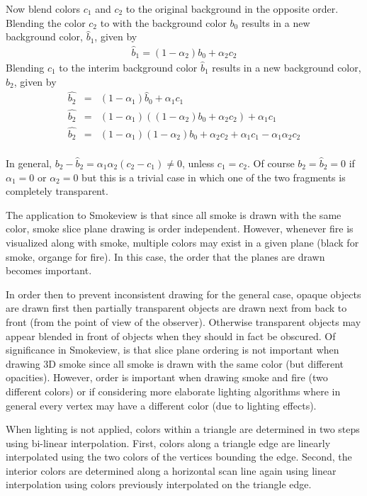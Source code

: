 \documentclass[11pt,twoside]{book}
\begin{document}
Now blend colors $c_1$ and $c_2$ to the original background in the opposite order.
Blending the color $c_2$ to with the background color $b_0$ results in a new background color, $\hat{b}_1$, given by
\begin{eqnarray*}
\hat{b}_1=(1-\alpha_2)b_0 + \alpha_2c_2
\end{eqnarray*}
Blending $c_1$ to the interim background color $\hat{b}_1$ results in a new background color, $\hat{b}_2$, given by
\begin{eqnarray*}
\hat{b_2}&=&(1-\alpha_1)\hat{b}_0+\alpha_1c_1\\
\hat{b_2}&=&(1-\alpha_1)((1-\alpha_2)b_0 + \alpha_2c_2)+\alpha_1c_1\\
\hat{b_2}&=&(1-\alpha_1)(1-\alpha_2)b_0 + \alpha_2c_2 + \alpha_1c_1 - \alpha_1\alpha_2c_2\\
\end{eqnarray*}


In general, $b_2-\hat{b}_2=\alpha_1\alpha_2(c_2-c_1)\ne 0$, unless $c_1=c_2$.  Of course $b_2=\hat{b}_2=0$ if $\alpha_1=0$ or $\alpha_2=0$ but this is a trivial case in which one of the two fragments is completely transparent.

The application to Smokeview is that since all smoke is drawn with the same color, smoke slice plane drawing is order independent.  However, whenever fire is visualized along with smoke, multiple colors may exist in a given plane (black for smoke, organge for fire).  In this case, the order that the planes are drawn becomes important.

In order then to prevent inconsistent drawing for the general
case, opaque objects are drawn first then partially transparent
objects are drawn next from back to front (from the point of view
of the observer). Otherwise transparent objects may appear blended
in front of objects when they should in fact be obscured. Of
significance in Smokeview, is that slice plane ordering is not
important when drawing 3D smoke since all smoke is drawn with the
same color (but different opacities).  However, order is important
when drawing smoke and fire (two different colors) or if
considering more elaborate lighting algorithms where in general
every vertex may have a different color (due to lighting effects).

When lighting is not applied, colors within a triangle are
determined in two steps using bi-linear interpolation. First,
colors along a triangle edge are linearly interpolated using the
two colors of the vertices bounding the edge. Second, the interior
colors are determined along a horizontal scan line again using
linear interpolation using colors previously interpolated on the
triangle edge.
\end{document}
